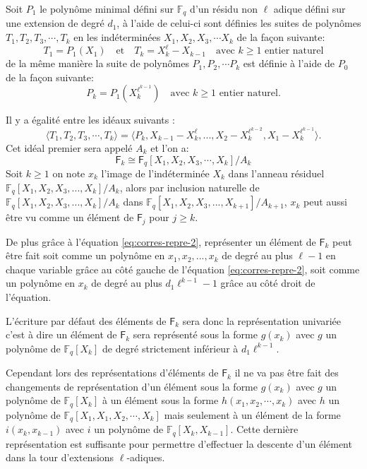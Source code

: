 \documentclass[10pt,a4paper]{book}
\theoremstyle{plain}
\theoremstyle{definition}
\theoremstyle{definition}
\theoremstyle{definition}
\theoremstyle{definition}
\theoremstyle{definition}
\theoremstyle{remark}
\theoremstyle{remark}
\theoremstyle{definition}
\begin{document}
Soit $P_1$ le polynôme minimal défini sur $\mathbb{F}_q$ d'un résidu non $\ell$ adique défini sur une extension de degré $d_1$, à l'aide de celui-ci sont définies les suites de polynômes $T_1,T_2,T_3,\cdots, T_k$ en les indéterminées $X_1,X_2,X_3, \cdots X_k$ de la façon suivante:
\[
T_1=P_1(X_1) \quad \text{et} \quad T_k=X_k^{\ell}-X_{k-1} \quad \text{avec $k \geqslant 1$ entier naturel}
\]  de la même manière la suite de polynômes $P_1,P_2, \cdots P_k$ est définie à l'aide de $P_0$ de la façon suivante:
\[
P_k=P_1(X_k^{\ell^{k-1}}) \quad \text{avec $k \geqslant 1$ entier naturel.} 
\]

Il y a égalité entre les idéaux suivants :
\begin{equation}
\label{eq:corres-repre-2}
\langle T_1, T_2, T_3, \cdots, T_k \rangle = \langle P_k, X_{k-1}-X_k^{\ell}, ..., X_2-X_{k}^{\ell^{k-2}}, X_1-X_k^{\ell^{k-1}} \rangle.
\end{equation}
Cet idéal premier sera appelé $A_k$ et l'on a:
\[
\mathsf{F}_k \cong \mathsf{F}_q[X_1,X_2,X_3,\cdots,X_k]/A_k
\]
Soit $k \geqslant 1$  on note $x_k$ l'image de l'indéterminée $X_k$ dans l'anneau résiduel $\mathbb{F}_q[X_1,X_2,X_3, ...,X_k]/A_k$, alors par inclusion naturelle de $\mathbb{F}_q[X_1,X_2,X_3, ...,X_k]/A_k$ dans $\mathbb{F}_q[X_1,X_2,X_3, ...,X_{k+1}]/A_{k+1}$, $x_k$ peut aussi être vu comme un élément de $\mathsf{F}_{j}$ pour $j \geqslant k$.

De plus grâce à l'équation \eqref{eq:corres-repre-2}, représenter un élément de $\mathsf{F}_k$ peut être fait soit comme un polynôme en $x_1,x_2, ..., x_k$ de degré au plus $\ell-1$ en chaque variable grâce au côté gauche de l'équation \eqref{eq:corres-repre-2}, soit comme un polynôme en $x_k$ de degré au plus $d_1\ell^{k-1}-1$ grâce au côté droit de l'équation.

L'écriture par défaut des éléments de $\mathsf{F}_k$ sera donc la représentation univariée c'est à dire un élément de $\mathsf{F}_k$ sera représenté sous la forme $g(x_k)$ avec $g$ un polynôme de $\mathbb{F}_q[X_k]$ de degré strictement inférieur à $d_1\ell^{k-1}$. 

Cependant lors des représentations d'éléments de $\mathsf{F}_k$ il ne va pas être fait des changements de représentation d'un élément sous la forme $g(x_k)$ avec $g$ un polynôme de $\mathbb{F}_q[X_k]$ à un élément sous la forme $h(x_1,x_2,\cdots,x_k)$ avec $h$ un polynôme de $\mathbb{F}_q[X_1,X_1,X_2,\cdots,X_k]$ mais seulement à un élément de la forme $i(x_k,x_{k-1})$ avec $i$ un polynôme de $\mathbb{F}_q[X_k,X_{k-1}]$. Cette dernière représentation est suffisante pour permettre d'effectuer la descente d'un élément dans la tour d'extensions $\ell$-adiques.
\end{document}
